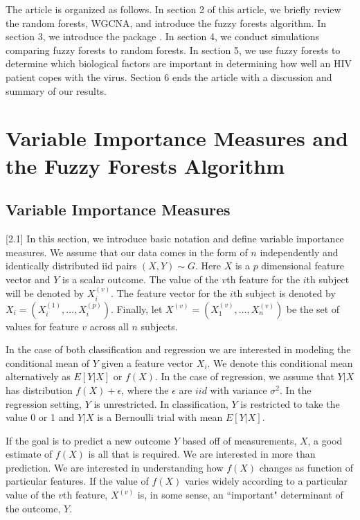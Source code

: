 \documentclass[article,shortnames]{jss}
\begin{document}
The article is organized as follows.  In section 2 of this article, we briefly review the random forests, WGCNA, and introduce the fuzzy forests algorithm.
In section 3, we introduce the  package .  In section 4, we conduct simulations comparing fuzzy forests to random forests.  In section 5, we use fuzzy forests to determine which biological factors are important in determining how well an HIV patient copes with the virus.  Section 6 ends the article with a discussion and summary of our results. 

\section{Variable Importance Measures and the Fuzzy Forests Algorithm}
\subsection{Variable Importance Measures}[2.1]
In this section, we introduce basic notation and define variable importance measures.  We assume that our data comes in the form of $n$ independently and identically distributed iid
pairs $(X,Y) \sim G$.  Here $X$ is a $p$ dimensional feature vector and $Y$ is a scalar outcome.  The value of the $v$th feature for the $i$th subject will be denoted by $X_{i}^{(v)}$.
The feature vector for the $i$th subject is denoted by $X_{i}=(X_{i}^{(1)},\ldots,X_{i}^{(p)})$.   Finally, let $X^{(v)}=(X_{1}^{(v)},\ldots,X_{n}^{(v)})$ be the set of values for feature $v$ across
all $n$ subjects.

In the case of both classification and regression we are interested in modeling the conditional mean of $Y$ given a feature vector $X_{i}$.  We denote this conditional mean alternatively as $E[Y|X]$ or $f(X)$.
In the case of regression, we assume that $Y|X$ has distribution $f(X) + \epsilon$, where the $\epsilon$ are $iid$ with variance $\sigma^{2}$.   In the regression setting, $Y$ is unrestricted. 
In classification, $Y$ is restricted to take the value 0 or 1 and $Y|X$ is a Bernoulli trial with mean $E[Y|X]$.  

If the goal is to predict a new outcome $Y$ based off of measurements, $X$, a good estimate of $f(X)$ is all that is required.
We are interested in more than prediction.  We are interested in understanding how $f(X)$ changes as function of particular features. 
If the value of $f(X)$ varies widely according to a particular value of the $v$th feature, $X^{(v)}$ is, in some sense, an ``important" determinant of
the outcome, $Y$.  
\end{document}
